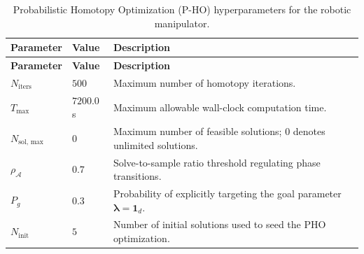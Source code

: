 \begin{longtable}{@{}p{}p{}p{}@{}}
    \caption{Probabilistic Homotopy Optimization (P-HO) hyperparameters for the robotic manipulator.}
    \label{tab:params_pho_robot}\\
        \toprule
        \textbf{Parameter} & \textbf{Value} & \textbf{Description} \\
        \midrule
\endfirsthead

        \toprule
        \textbf{Parameter} & \textbf{Value} & \textbf{Description} \\
        \midrule
\endhead

        \bottomrule
\endfoot

        $N_{\text{iters}}$ & $500$ & Maximum number of homotopy iterations. \\
        $T_{\max}$ & $7200.0$\,s & Maximum allowable wall-clock computation time. \\
        $N_{\text{sol, max}}$ & $0$ & Maximum number of feasible solutions; $0$ denotes unlimited solutions. \\
        $\rho_{\mathcal{A}}$ & $0.7$ & Solve-to-sample ratio threshold regulating phase transitions. \\
        $P_g$ & $0.3$ & Probability of explicitly targeting the goal parameter $\boldsymbol{\lambda} = \mathbf{1}_d$. \\
        $N_{\text{init}}$ & $5$ & Number of initial solutions used to seed the PHO optimization. \\
        \bottomrule
\end{longtable}

